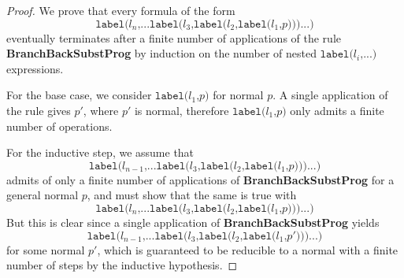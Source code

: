 \documentclass[11pt]{article}
\begin{document}
\begin{proof}

We prove that every formula of the form
$$\texttt{label(}l_{n}\texttt{,} ... \texttt{label(}l_{3}\texttt{,} \texttt{label(}l_{2}\texttt{,} \texttt{label(}l_{1}\texttt{,} p\texttt{)}\texttt{)}\texttt{)} ... \texttt{)}$$
eventually terminates after a finite number of applications of the rule \textbf{BranchBackSubstProg} by induction on the number of nested $\texttt{label(}l_{i}\texttt{,} ... \texttt{)}$ expressions.

For the base case, we consider $\texttt{label(}l_{1}\texttt{,} p \texttt{)}$ for normal $p$.  A single application of the rule gives $p'$, where $p'$ is normal, therefore $\texttt{label(}l_{1}\texttt{,} p \texttt{)}$ only admits a finite number of operations.

For the inductive step, we assume that $$\texttt{label(}l_{n-1}\texttt{,} ... \texttt{label(}l_{3}\texttt{,} \texttt{label(}l_{2}\texttt{,} \texttt{label(}l_{1}\texttt{,} p\texttt{)}\texttt{)}\texttt{)} ... \texttt{)}$$ admits of only a finite number of applications of \textbf{BranchBackSubstProg} for a general normal $p$, and must show that the same is true with $$\texttt{label(}l_{n}\texttt{,} ... \texttt{label(}l_{3}\texttt{,} \texttt{label(}l_{2}\texttt{,} \texttt{label(}l_{1}\texttt{,} p\texttt{)}\texttt{)}\texttt{)} ... \texttt{)}$$
But this is clear since a single application of \textbf{BranchBackSubstProg} yields $$\texttt{label(}l_{n-1}\texttt{,} ... \texttt{label(}l_{3}\texttt{,} \texttt{label(}l_{2}\texttt{,} \texttt{label(}l_{1}\texttt{,} p'\texttt{)}\texttt{)}\texttt{)} ... \texttt{)}$$ for some normal $p'$, which is guaranteed to be reducible to a normal with a finite number of steps by the inductive hypothesis.

\begin{comment}
Suppose that \textbf{BranchBackSubstProg} is not normalizing, then this implies that we can apply the rule \textbf{BranchBackSubstProg} an arbitrary number of times without ever reaching a normal form.  

Each time \textbf{BranchBackSubstProg} is applied, a substitution is performed on some $l \in L$, therefore if it can be applied infinitely, there must be some infinite sequence $l_{1}, l_{2}, l_{3}, ...$ of labels that we expand.  But because the set of labels in the program is finite, at least some label must occur multiple times in the sequence.
\end{comment}

\end{proof}
\end{document}
